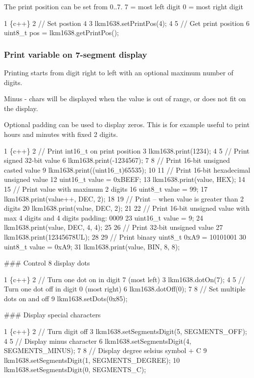 The print position can be set from 0..7. 7 = most left digit 0 = most right digit


\begin{DoxyCode}
1 \{c++\}
2 // Set postion 4
3 lkm1638.setPrintPos(4);
4 
5 // Get print position
6 uint8\_t pos = lkm1638.getPrintPos();
\end{DoxyCode}


\subsubsection*{Print variable on 7-\/segment display}

Printing starts from digit right to left with an optional maximum number of digits.

Minus \textquotesingle{}-\/\textquotesingle{} chars will be displayed when the value is out of range, or does not fit on the display.

Optional padding can be used to display zero\textquotesingle{}s. This is for example useful to print hours and minutes with fixed 2 digits.


\begin{DoxyCode}
1 \{c++\}
2 // Print int16\_t on print position
3 lkm1638.print(1234);
4 
5 // Print signed 32-bit value
6 lkm1638.print(-1234567);
7 
8 // Print 16-bit unsigned casted value
9 lkm1638.print((uint16\_t)65535);
10 
11 // Print 16-bit hexadecimal unsigned value
12 uint16\_t value = 0xBEEF;
13 lkm1638.print(value, HEX); 
14 
15 // Print value with maximum 2 digits
16 uint8\_t value = 99;
17 lkm1638.print(value++, DEC, 2);
18 
19 // Print -- when value is greater than 2 digits 
20 lkm1638.print(value, DEC, 2); 
21 
22 // Print 16-bit unsigned value with max 4 digits and 4 digits padding: 0009 
23 uint16\_t value = 9;
24 lkm1638.print(value, DEC, 4, 4);
25 
26 // Print 32-bit unsigned value
27 lkm1638.print(12345678UL);
28 
29 // Print binary uint8\_t 0xA9 = 10101001
30 uint8\_t value = 0xA9;
31 lkm1638.print(value, BIN, 8, 8);
\end{DoxyCode}


\#\#\# Control 8 display dots 
\begin{DoxyCode}
1 \{c++\}
2 // Turn one dot on in digit 7 (most left)
3 lkm1638.dotOn(7);
4 
5 // Turn one dot off in digit 0 (most right)
6 lkm1638.dotOff(0);
7 
8 // Set multiple dots on and off
9 lkm1638.setDots(0x85);
\end{DoxyCode}


\#\#\# Display special characters 
\begin{DoxyCode}
1 \{c++\}
2 // Turn digit off
3 lkm1638.setSegmentsDigit(5, SEGMENTS\_OFF);
4 
5 // Display minus character
6 lkm1638.setSegmentsDigit(4, SEGMENTS\_MINUS);
7 
8 // Display degree selsius symbol + C
9 lkm1638.setSegmentsDigit(1, SEGMENTS\_DEGREE);
10 lkm1638.setSegmentsDigit(0, SEGMENTS\_C);
\end{DoxyCode}


